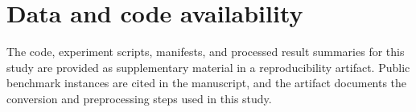 \section*{Data and code availability}
The code, experiment scripts, manifests, and processed result summaries for this study are provided as supplementary material in a reproducibility artifact. Public benchmark instances are cited in the manuscript, and the artifact documents the conversion and preprocessing steps used in this study.
